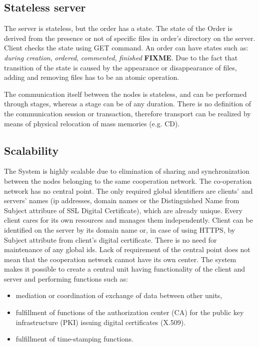 \documentclass[a4paper]{article}
\begin{document}
\subsection{Stateless server}

The server is stateless, but the order has a state. The state of the Order is derived 
from the presence or not of specific files in order's directory
on the server. Client checks the state using GET command. An order can
have states such as: \emph{during creation}, \emph{ordered}, \emph{commented},
\emph{finished} \textbf{FIXME}. Due to the fact that transition of the state is caused by 
the appearance or disappearance of files, adding and removing files has to be an atomic 
operation. 

The communication itself between the nodes is stateless, and can be performed through stages, 
whereas a stage can be of any duration. There is no definition of the communication session
or transaction, therefore transport can be realized by means of physical relocation of mass
memories (e.g. CD).

\subsection{Scalability}

The System is highly scalable due to elimination of sharing and synchronization between the 
nodes belonging to the same cooperation network. The co-operation network has no central point. 
The only required global identifiers are clients' and servers' names (ip addresses, domain names 
or the Distinguished Name from Subject attribure of SSL Digital Certificate),
which are already unique. Every client cares for its own resources and manages them independently. 
Client can be identified on the server by its domain name or, in case of using HTTPS, by 
Subject attribute from client's digital certificate. There is no need for maintenance of any 
global ids.
	Lack of requirement of the central point does not mean that the cooperation network cannot
have its own center. The system makes it possible to create a central unit having functionality
of the client and server and performing functions such as:
\begin{itemize}
	\item mediation or coordination of exchange of data between other units,
	\item fulfillment of functions of the authorization center (CA) for the public key infrastructure (PKI) issuing digital certificates (X.509).
	\item fulfillment of time-stamping functions.
\end{itemize}
\end{document}
